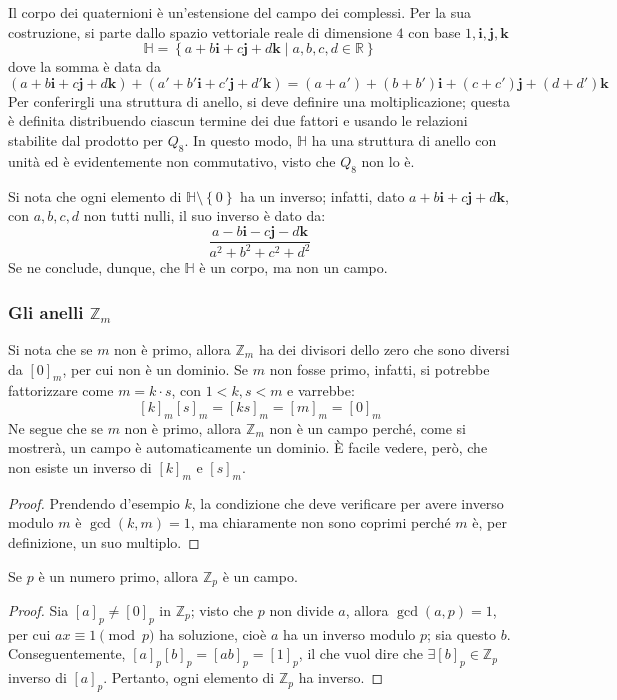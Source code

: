 \documentclass[11pt, a4paper]{scrartcl}
\theoremstyle{definition}
\numberwithin{esempio}{section}
\theoremstyle{definition}
\numberwithin{obs}{section}
\numberwithin{nota}{section}
\numberwithin{equation}{subsection}
\begin{document}
Il corpo dei quaternioni \`e un'estensione del campo dei complessi.
Per la sua costruzione, si parte dallo spazio vettoriale reale di dimensione $4$ con base $1,\mathbf{i} ,\mathbf{j} ,\mathbf{k} $
\[
\mathbb{H}=\left\{ a + b \mathbf{i} + c \mathbf{j}  + d \mathbf{k}  \mid a,b,c,d \in \mathbb{R} \right\} 
\] 
dove la somma \`e data da
\[
(a+b \mathbf{i} + c \mathbf{j} + d \mathbf{k} )+(a' +b'\mathbf{i} + c' \mathbf{j} + d' \mathbf{k} ) = (a+a') +(b+b')\mathbf{i} + (c+c') \mathbf{j} +(d+d')\mathbf{k} 
\] 
Per conferirgli una struttura di anello, si deve definire una moltiplicazione; questa \`e definita distribuendo ciascun termine dei due fattori e usando le relazioni stabilite dal prodotto per $Q_8$.
In questo modo, $\mathbb{H}$ ha una struttura di anello con unit\`a ed \`e evidentemente non commutativo, visto che $Q_8$ non lo \`e.

Si nota che ogni elemento di $\mathbb{H} \setminus \left\{ 0 \right\} $ ha un inverso; infatti, dato $a+b \mathbf{i} +c \mathbf{j} + d \mathbf{k} $, con $a,b,c,d$ non tutti nulli, il suo inverso \`e dato da:
\[
\frac{a - b \mathbf{i}  - c \mathbf{j} - d\mathbf{k} }{a^2 +b^2 + c^2 + d^2}
\] 
Se ne conclude, dunque, che $\mathbb{H}$ \`e un corpo, ma non un campo.
\subsubsection{Gli anelli $\mathbb{Z}_m$}
Si nota che se $m$ non \`e primo, allora $\mathbb{Z}_m$ ha dei divisori dello zero che sono diversi da $[0]_m$, per cui non \`e un dominio.
Se $m$ non fosse primo, infatti, si potrebbe fattorizzare come $m = k \cdot  s$, con $1<k,s<m$ e varrebbe:
\[
	[k]_m[s]_m = [ks]_m = [m]_m = [0]_m
\] 
Ne segue che se $m$ non \`e primo, allora $\mathbb{Z}_m$ non \`e un campo perch\'e, come si mostrer\`a, un campo \`e automaticamente un dominio.
\`E facile vedere, per\`o, che non esiste un inverso di $[k]_m$ e $[s]_m$.
\begin{proof}
	Prendendo d'esempio $k$, la condizione che deve verificare per avere inverso modulo $m$ \`e $\operatorname{gcd}(k,m) = 1$, ma chiaramente non sono coprimi perch\'e $m$ \`e, per definizione, un suo multiplo.
\end{proof}
\begin{teorema}
	{}{}
	Se $p$ \`e un numero primo, allora $\mathbb{Z}_p$ \`e un campo.
\begin{proof}
	Sia $[a]_p\neq [0]_p$ in $\mathbb{Z}_p$; visto che $p$ non divide $a$, allora $\operatorname{gcd}(a,p) = 1$, per cui $ax \equiv 1 \pmod{p}  $ ha soluzione, cio\`e $a$ ha un inverso modulo $p$; sia questo $b$.
	Conseguentemente, $[a]_p[b]_p = [ab]_p = [1]_p$, il che vuol dire che $\exists [b]_p \in \mathbb{Z}_p$ inverso di $[a]_p$.
	Pertanto, ogni elemento di $\mathbb{Z}_p$ ha inverso.
\end{proof}
\end{teorema}
\end{document}
